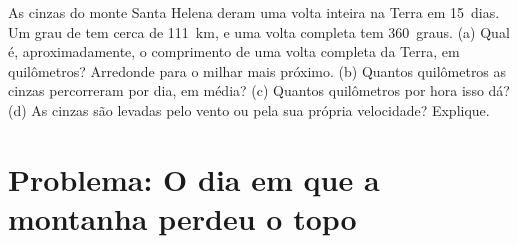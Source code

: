 \begin{exercise}[$\star\star\star$]\label{exo:g7:volcanoes:12}
As cinzas do monte Santa Helena deram uma volta inteira na Terra em
15~dias. Um grau de  tem cerca de \qty{111}{km}, e uma volta
completa tem 360~graus. (a) Qual é, aproximadamente, o comprimento de uma
volta completa da Terra, em quilômetros? Arredonde para o milhar mais
próximo. (b) Quantos quilômetros as cinzas percorreram por dia, em média?
(c) Quantos quilômetros por hora isso dá? (d) As cinzas são levadas pelo
vento ou pela sua própria velocidade? Explique.
\end{exercise}

\section{Problema: O dia em que a montanha perdeu o topo}

